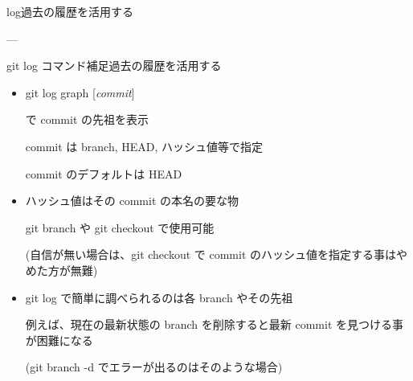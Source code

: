 \begin{frame}[t]{log}{過去の履歴を活用する}
{    

    ---
    \vspace{2ex}

  }

\end{frame}


\begin{frame}[t]{git log コマンド補足}{過去の履歴を活用する}

  \begin{itemize}
  \item git log {\dhyphen}graph [\textit{commit}]

    で commit の先祖を表示

    commit は branch, HEAD, ハッシュ値等で指定

    commit のデフォルトは HEAD
    \vspace{2ex}

  \item ハッシュ値はその commit の本名の要な物

    git branch や git checkout で使用可能

    (自信が無い場合は、git checkout で commit のハッシュ値を指定する事はやめた方が無難)
    \vspace{2ex}

  \item git log で簡単に調べられるのは各 branch やその先祖

    例えば、現在の最新状態の branch を削除すると最新 commit を見つける事が困難になる

    (git branch -d でエラーが出るのはそのような場合)
  \end{itemize}

\end{frame}
